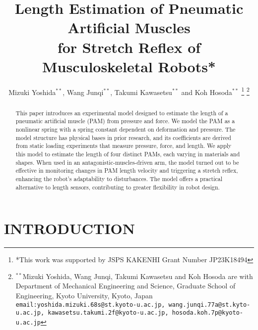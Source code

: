 \documentclass[letterpaper, 10 pt, conference]{IEEEconf}
\title{\LARGE \bf
Length Estimation of Pneumatic Artificial Muscles \\for Stretch Reflex of Musculoskeletal Robots*}
\author{Mizuki Yoshida$^{**}$, Wang Junqi$^{**}$, Takumi Kawasetsu$^{**}$ and Koh Hosoda$^{**}$%
\thanks{*This work was supported by JSPS KAKENHI Grant Number JP23K18494}%
\thanks{$^{**}$Mizuki Yoshida, Wang Junqi, Takumi Kawasetsu and Koh Hosoda are with Department of Mechanical Engineering and Science, Graduate School of Engineering, Kyoto University, Kyoto, Japan
{\tt\small email:yoshida.mizuki.68s@st.kyoto-u.ac.jp, wang.junqi.77a@st.kyto-u.ac.jp, kawasetsu.takumi.2f@kyoto-u.ac.jp, hosoda.koh.7p@kyoto-u.ac.jp}
 }
}
\begin{document}
\maketitle
\thispagestyle{empty}
\pagestyle{empty}


\begin{abstract}
This paper introduces an experimental model designed to estimate the length of a pneumatic artificial muscle (PAM) from pressure and force. We model the PAM as a nonlinear spring with a spring constant dependent on deformation and pressure. The model structure has physical bases in prior research, and its coefficients are derived from static loading experiments that measure pressure, force, and length. We apply this model to estimate the length of four distinct PAMs, each varying in materials and shapes. When used in an antagonistic-muscles-driven arm, the model turned out to be effective in monitoring changes in PAM length velocity and triggering a stretch reflex, enhancing the robot's adaptability to disturbances.  The model offers a practical alternative to length sensors, contributing to greater flexibility in robot design.




\end{abstract}




\section{INTRODUCTION}

\end{document}
